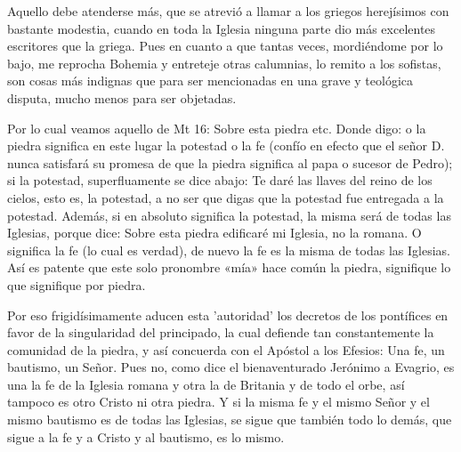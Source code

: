 Aquello debe atenderse más, que se atrevió a llamar a los griegos herejísimos con bastante modestia, cuando en toda la Iglesia ninguna parte dio más excelentes escritores que la griega. Pues en cuanto a que tantas veces, mordiéndome por lo bajo, me reprocha Bohemia y entreteje otras calumnias, lo remito a los sofistas, son cosas más indignas que para ser mencionadas en una grave y teológica disputa, mucho menos para ser objetadas.

Por lo cual veamos aquello de Mt 16: Sobre esta piedra etc. Donde digo: o la piedra significa en este lugar la potestad o la fe (confío en efecto que el señor D. nunca satisfará su promesa de que la piedra significa al papa o sucesor de Pedro); si la potestad, superfluamente se dice abajo: Te daré las llaves del reino de los cielos, esto es, la potestad, a no ser que digas que la potestad fue entregada a la potestad. Además, si en absoluto significa la potestad, la misma será de todas las Iglesias, porque dice: Sobre esta piedra edificaré mi Iglesia, no la romana. O significa la fe (lo cual es verdad), de nuevo la fe es la misma de todas las Iglesias. Así es patente que este solo pronombre «mía» hace común la piedra, signifique lo que signifique por piedra.

Por eso frigidísimamente aducen esta 'autoridad' los decretos de los pontífices en favor de la singularidad del principado, la cual defiende tan constantemente la comunidad de la piedra, y así concuerda con el Apóstol a los Efesios: Una fe, un bautismo, un Señor. Pues no, como dice el bienaventurado Jerónimo a Evagrio, es una la fe de la Iglesia romana y otra la de Britania y de todo el orbe, así tampoco es otro Cristo ni otra piedra. Y si la misma fe y el mismo Señor y el mismo bautismo es de todas las Iglesias, se sigue que también todo lo demás, que sigue a la fe y a Cristo y al bautismo, es lo mismo.

